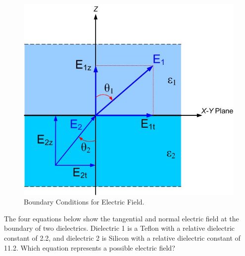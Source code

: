 \documentclass{ximera}
\begin{document}
\begin{figure}[htbp]
\begin{center}
\includegraphics[scale=0.4]{../jpg/boundaryconditions.jpg}
\end{center}
\caption{Boundary Conditions for Electric Field.}
\label{fig:BoundaryCondition}
\end{figure}










   \begin{question}
 The four equations below show the tangential and normal electric field at the boundary of two dielectrics. Dielectric 1 is a Teflon with a relative dielectric constant of 2.2, and dielectric 2 is Silicon with a relative dielectric constant of 11.2. Which equation represents a possible electric field? 
   \begin{multipleChoice}
   \end{multipleChoice}
   \end{question}
   
\end{document}
